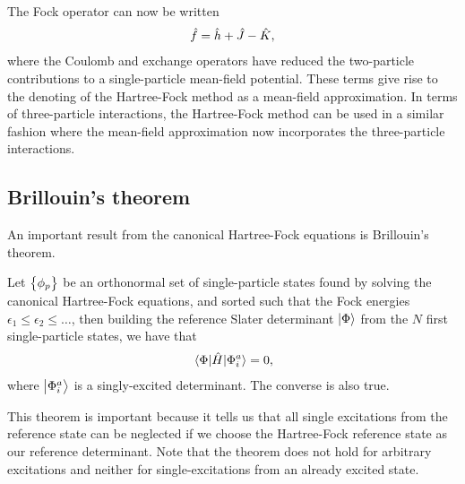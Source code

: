             The Fock operator can now be written
            \begin{align}
                \hat{f}
                = \hat{h}
                + \hat{J} - \hat{K},
            \end{align}
            where the Coulomb and exchange operators have reduced the
            two-particle contributions to a single-particle mean-field
            potential.
            These terms give rise to the denoting of the Hartree-Fock method as
            a mean-field approximation.
            In terms of three-particle interactions, the Hartree-Fock method can
            be used in a similar fashion where the mean-field approximation now
            incorporates the three-particle interactions.

        \subsection{Brillouin's theorem}
            An important result from the canonical Hartree-Fock equations is
            Brillouin's theorem.
            \begin{theorem}
                \label{theorem:brillouin}
                Let $\left\{ \phi_p \right\}$ be an orthonormal set of single-particle
                states found by solving the canonical Hartree-Fock equations,
                and sorted such that the Fock energies $\epsilon_1 \leq
                \epsilon_2 \leq \dots$, then building the reference Slater
                determinant $\ket{\Phi}$ from the $N$ first single-particle
                states, we have that
                \begin{align}
                    \mel{\Phi}{\hat{H}}{\Phi^{a}_{i}} = 0,
                \end{align}
                where $\ket{\Phi^{a}_{i}}$ is a singly-excited determinant.
                The converse is also true.
            \end{theorem}
            This theorem is important because it tells us that all single
            excitations from the reference state can be neglected if we choose
            the Hartree-Fock reference state as our reference determinant.
            Note that the theorem does not hold for arbitrary excitations and
            neither for single-excitations from an already excited state.
